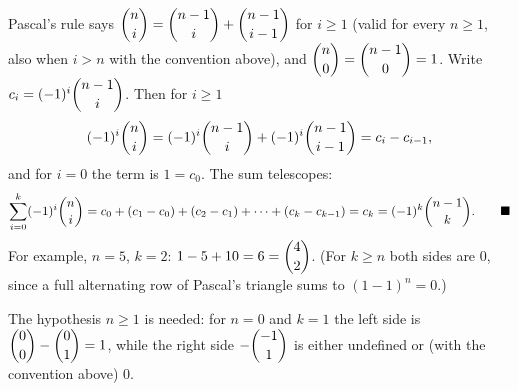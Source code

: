 Pascal's rule says $\dbinom ni=\dbinom{n-1}{i}+\dbinom{n-1}{i-1}$ for $i\ge1$ (valid for every $n\ge1$, also when $i>n$ with the convention above), and $\dbinom n0=\dbinom{n-1}{0}=1$. Write $c_i=(-1)^i\dbinom{n-1}{i}$. Then for $i\ge1$
\[
(-1)^i\dbinom ni=(-1)^i\dbinom{n-1}{i}+(-1)^i\dbinom{n-1}{i-1}=c_i-c_{i-1},
\]
and for $i=0$ the term is $1=c_0$. The sum telescopes:
\[
\sum_{i=0}^{k}(-1)^i\dbinom ni=c_0+(c_1-c_0)+(c_2-c_1)+\cdots+(c_k-c_{k-1})=c_k=(-1)^k\dbinom{n-1}{k}. \qquad\blacksquare
\]
For example, $n=5$, $k=2$: $1-5+10=6=\dbinom42$. (For $k\ge n$ both sides are $0$, since a full alternating row of Pascal's triangle sums to $(1-1)^n=0$.)

The hypothesis $n\ge1$ is needed: for $n=0$ and $k=1$ the left side is $\dbinom00-\dbinom01=1$, while the right side $-\dbinom{-1}{1}$ is either undefined or (with the convention above) $0$.
